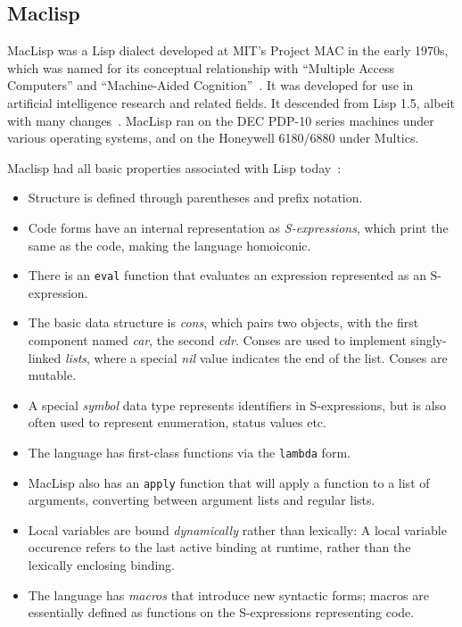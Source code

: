 \documentclass[format=acmsmall, review]{acmart}
\begin{document}
\subsection{Maclisp}

MacLisp was a Lisp dialect developed at MIT's Project MAC in the early
1970s, which was named for its conceptual relationship with ``Multiple
Access Computers'' and ``Machine-Aided Cognition''~\cite{Pitman1983}.
It was developed for use in artificial intelligence research and
related fields.  It descended from Lisp 1.5, albeit with many changes~\cite{Moon1974}.
MacLisp ran on the DEC PDP-10 series machines under various operating
systems, and on the Honeywell 6180/6880 under Multics.

Maclisp had all basic properties associated with Lisp today~\cite{Moon1974}:
%
\begin{itemize}
\item Structure is defined through parentheses and prefix notation.
\item Code forms have an internal representation as
  \textit{S-expressions}, which print the same as the code, making the
  language homoiconic.
\item There is an \texttt{eval} function that evaluates an expression
  represented as an S-expression.
\item The basic data structure is \textit{cons}, which pairs two
  objects, with the first component named \textit{car}, the second
  \textit{cdr}.  Conses are used to implement singly-linked
  \textit{lists}, where a special \textit{nil} value indicates the end
  of the list.  Conses are mutable.
\item A special \textit{symbol} data type represents identifiers in
  S-expressions, but is also often used to represent enumeration,
  status values etc.
\item The language has first-class functions via the \texttt{lambda}
  form.
\item MacLisp also has an \texttt{apply} function that will apply a
  function to a list of arguments, converting between argument lists
  and regular lists.
\item Local variables are bound \textit{dynamically} rather than
  lexically: A local variable occurence refers to the last active
  binding at runtime, rather than the lexically enclosing binding.
\item The language has \textit{macros} that introduce new syntactic
  forms; macros are essentially defined as functions on the S-expressions
  representing code.
\end{itemize}
\end{document}
